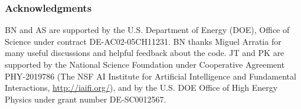 \documentclass{article} %
\begin{document}

\subsubsection*{Acknowledgments}
BN and AS are supported by the U.S. Department of Energy (DOE), Office of Science under contract DE-AC02-05CH11231.  BN thanks Miguel Arratia for many useful discussions and helpful feedback about the code.
%
JT and PK are supported by the National Science Foundation under Cooperative Agreement PHY-2019786 (The NSF AI Institute for Artificial Intelligence and Fundamental Interactions, \url{http://iaifi.org/}), and by the U.S. DOE Office of High Energy Physics under grant number DE-SC0012567.





\end{document}
